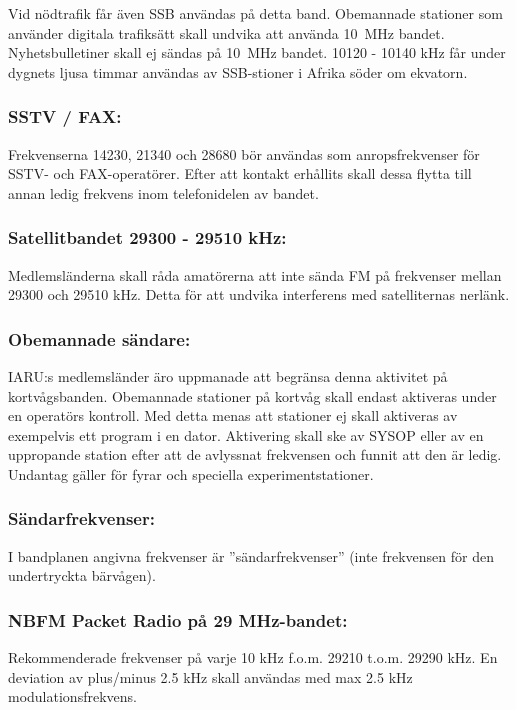 Vid nödtrafik får även SSB användas på detta band. Obemannade
stationer som använder digitala trafiksätt skall undvika att
använda 10~MHz bandet.
Nyhetsbulletiner skall ej sändas på 10~MHz bandet.
10120 - 10140 kHz får under dygnets ljusa timmar användas av
SSB-stioner i Afrika söder om ekvatorn.

\subsubsection{SSTV / FAX:}

Frekvenserna 14230, 21340 och 28680 bör användas
som anropsfrekvenser för SSTV- och FAX-operatörer.
Efter att kontakt erhållits skall dessa flytta till annan
ledig frekvens inom telefonidelen av bandet.

\subsubsection{Satellitbandet 29300 - 29510 kHz:}

Medlemsländerna skall råda amatörerna att inte sända
FM på frekvenser mellan 29300 och 29510 kHz. Detta
för att undvika interferens med satelliternas nerlänk.

\subsubsection{Obemannade sändare:}

IARU:s medlemsländer äro uppmanade att begränsa
denna aktivitet på kortvågsbanden.
Obemannade stationer på kortvåg skall endast aktiveras under en operatörs kontroll.
Med detta menas att stationer ej skall aktiveras av
exempelvis ett program i en dator. Aktivering skall ske
av SYSOP eller av en uppropande station efter att de
avlyssnat frekvensen och funnit att den är ledig.
Undantag gäller för fyrar och speciella experimentstationer.

\subsubsection{Sändarfrekvenser:}

I bandplanen angivna frekvenser är ''sändarfrekvenser''
(inte frekvensen för den undertryckta bärvågen).

\subsubsection{NBFM Packet Radio på 29 MHz-bandet:}

Rekommenderade frekvenser på varje 10 kHz f.o.m.
29210 t.o.m. 29290 kHz. En deviation av plus/minus 2.5
kHz skall användas med max 2.5 kHz modulationsfrekvens.
